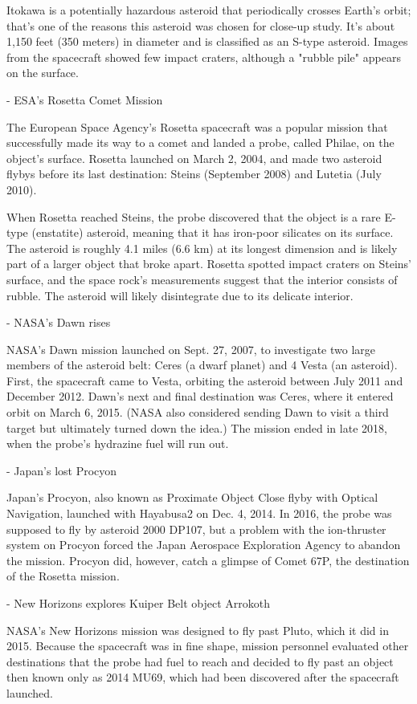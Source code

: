 Itokawa is a potentially hazardous asteroid that periodically crosses Earth's
orbit; that's one of the reasons this asteroid was chosen for close-up study.
It's about 1,150 feet (350 meters) in diameter and is classified as an S-type
asteroid. Images from the spacecraft showed few impact craters, although a
"rubble pile" appears on the surface.


- ESA's Rosetta Comet Mission

The European Space Agency's Rosetta spacecraft was a popular mission that
successfully made its way to a comet and landed a probe, called Philae, on the
object's surface. Rosetta launched on March 2, 2004, and made two asteroid
flybys before its last destination: Steins (September 2008) and Lutetia (July
2010).

When Rosetta reached Steins, the probe discovered that the object is a rare
E-type (enstatite) asteroid, meaning that it has iron-poor silicates on its
surface. The asteroid is roughly 4.1 miles (6.6 km) at its longest dimension and
is likely part of a larger object that broke apart. Rosetta spotted impact
craters on Steins' surface, and the space rock's measurements suggest that the
interior consists of rubble. The asteroid will likely disintegrate due to its
delicate interior.

- NASA's Dawn rises

NASA's Dawn mission launched on Sept. 27, 2007, to investigate two large members
of the asteroid belt: Ceres (a dwarf planet) and 4 Vesta (an asteroid). First,
the spacecraft came to Vesta, orbiting the asteroid between July 2011 and
December 2012. Dawn's next and final destination was Ceres, where it entered
orbit on March 6, 2015. (NASA also considered sending Dawn to visit a third
target but ultimately turned down the idea.) The mission ended in late 2018,
when the probe's hydrazine fuel will run out.

- Japan's lost Procyon

Japan's Procyon, also known as Proximate Object Close flyby with Optical
Navigation, launched with Hayabusa2 on Dec. 4, 2014. In 2016, the probe was
supposed to fly by asteroid 2000 DP107, but a problem with the ion-thruster
system on Procyon forced the Japan Aerospace Exploration Agency to abandon the
mission. Procyon did, however, catch a glimpse of Comet 67P, the destination of
the Rosetta mission.

- New Horizons explores Kuiper Belt object Arrokoth

NASA's New Horizons mission was designed to fly past Pluto, which it did in
2015. Because the spacecraft was in fine shape, mission personnel evaluated
other destinations that the probe had fuel to reach and decided to fly past an
object then known only as 2014 MU69, which had been discovered after the
spacecraft launched.


